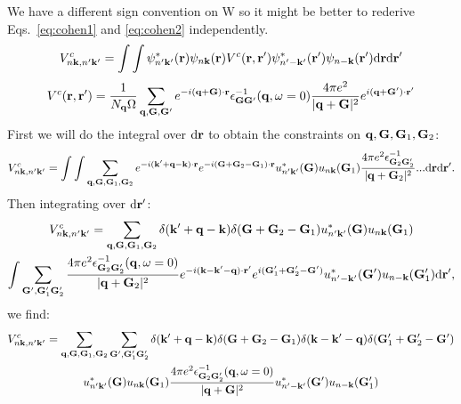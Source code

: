 \documentclass{article}
\def\r{{\bf r}}
\def\k{{\bf k}}
\def\q{{\bf q}}
\def\G{{\bf G}}
\begin{document}
We have a different sign convention on W so it might be better to rederive
Eqs.~\ref{eq:cohen1} and \ref{eq:cohen2} independently.
%
\begin{equation}
V^{c}_{n\k,n'\k'} = \int \int \psi^{*}_{n'\k'}(\r)\psi_{n\k}(\r)V^{c}(\r,\r')\psi^{*}_{n'-\k'}(\r')\psi_{n-\k}(\r')\rm{d}\r \rm{d}\r'
\end{equation}
%
\begin{equation}
V^{c}(\r,\r') = \frac{1}{N_{\q}\Omega}\sum_{\q,\G,\G'}e^{-i(\q+\G)\cdot\r} \epsilon^{-1}_{\G\G'}(\q,\omega=0)\frac{4\pi e^{2}}{|\q+\G|^{2}} e^{i(\q+\G')\cdot\r'}
\end{equation}
%
First we will do the integral over $\rm{d}\r$ to obtain the constraints on $\q,\G,\G_{1},\G_{2}$:
%
\begin{equation}
V^{c}_{n\k,n'\k'} = \int \int \sum_{\q,\G,\G_{1},\G_{2}} e^{-i(\k'+\q-\k)\cdot\r} e^{-i(\G+\G_{2}-\G_{1})\cdot\r} u^{*}_{n'\k'}(\G) u_{n\k}(\G_{1})\\
\frac{4\pi e^{2}\epsilon^{-1}_{\G_{2}\G_{2}'}}{|\q+\G_{2}|^{2}}...\rm{d}\r\rm{d}\r'.
\end{equation}
%
Then integrating over $\rm{d}\r'$:
%
\begin{multline}
V^{c}_{n\k,n'\k'} = \sum_{\q,\G,\G_{1},\G_{2}} \delta(\k'+\q-\k) \delta(\G+\G_{2}-\G_{1}) u^{*}_{n'\k'}(\G)u_{n\k}(\G_{1})\\
\int \sum_{\G',\G_{1}'\G_{2}'} \frac{4\pi e^{2}\epsilon^{-1}_{\G_{2}\G_{2}'}(\q,\omega=0)}{|\q+\G_{2}|^{2}}
e^{-i(\k-\k'-\q)\cdot\r'} e^{i(\G_{1}'+\G_{2}'-\G')}u^{*}_{n'-\k'}(\G') u_{n-\k}(\G_{1}')\rm{d}\r',
\end{multline}
%
we find:
%
\begin{multline}
V^{c}_{n\k,n'\k'} = \sum_{\q,\G,\G_{1},\G_{2}}\sum_{\G',\G_{1}'\G_{2}'} \delta(\k'+\q-\k)\delta(\G+\G_{2}-\G_{1})\delta(\k-\k'-\q)\delta(\G_{1}'+\G_{2}'-\G')\\ 
u^{*}_{n'\k'}(\G)u_{n\k}(\G_{1})\frac{4\pi e^{2}\epsilon^{-1}_{\G_{2}\G_{2}'}(\q,\omega=0)}{|\q+\G|^{2}} u^{*}_{n'-\k'}(\G')u_{n-\k}(\G_{1}')
\end{multline}
\end{document}
